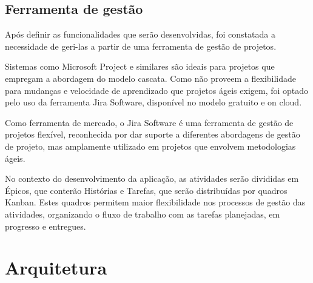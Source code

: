 \documentclass[
    12pt,               %
    openright,          %
    oneside,
    a4paper,            %
    BIBLATEX,           %
    TODO,               %
    english,            %
    brazil              %
    ]{ifsp-spo-inf-ctds}
\begin{document}
        
    \subsection{Ferramenta de gestão}
  
        Após definir as funcionalidades que serão desenvolvidas, foi constatada a necessidade de geri-las a partir de uma ferramenta de gestão de projetos.
        
        Sistemas como Microsoft Project e similares são ideais para projetos que empregam a abordagem do modelo cascata. Como não proveem a flexibilidade para mudanças e velocidade de aprendizado que projetos ágeis exigem, foi optado pelo uso da ferramenta Jira Software, disponível no modelo gratuito e on cloud.
        
        Como ferramenta de mercado, o Jira Software é uma ferramenta de gestão de projetos flexível, reconhecida por dar suporte a diferentes abordagens de gestão de projeto, mas amplamente utilizado em projetos que envolvem metodologias ágeis\cite{jira}.
        
        No contexto do desenvolvimento da aplicação, as atividades serão divididas em Épicos, que conterão Histórias e Tarefas, que serão distribuídas por quadros Kanban. Estes quadros permitem maior flexibilidade nos processos de gestão das atividades, organizando o fluxo de trabalho com as tarefas planejadas, em progresso e entregues\cite{jira}.
        

    \section{Arquitetura}
        

        
\end{document}
